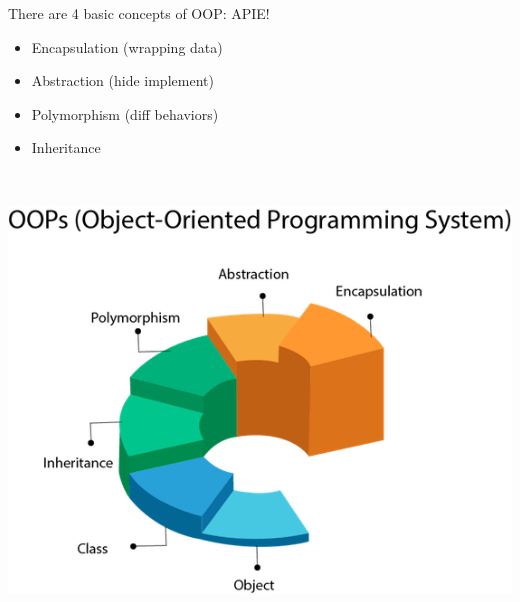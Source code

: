 \documentclass[11pt,twoside,a4paper]{article}
\begin{document}
\begin{landscape}
\begin{multicols}{2}
\begin{minipage}{0.50\linewidth}
There are 4 basic concepts of OOP: APIE!
\begin{itemize}
	\item Encapsulation (wrapping data)
	\item Abstraction (hide implement)
	\item Polymorphism (diff behaviors)
	\item Inheritance
\end{itemize}~\\
\end{minipage}
\begin{minipage}{0.50\linewidth}
	\includegraphics[width=1.00\linewidth]{./OOPsConceptsRepresentation.png}
\end{minipage}


	

\end{multicols}
\end{landscape}
\end{document}
